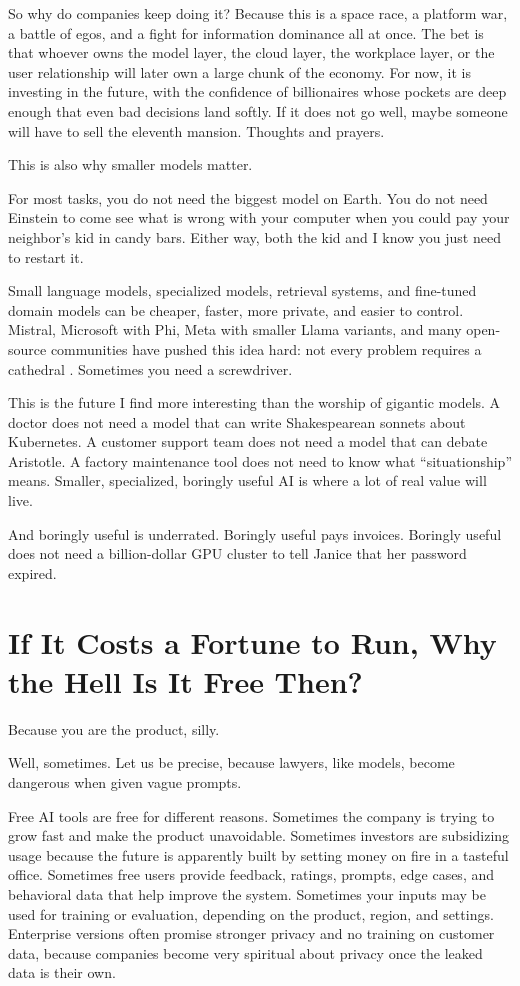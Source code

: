 \documentclass[12pt,oneside]{book}
\begin{document}
So why do companies keep doing it? Because this is a space race, a platform war, a battle of egos, and a fight for information dominance all at once. The bet is that whoever owns the model layer, the cloud layer, the workplace layer, or the user relationship will later own a large chunk of the economy. For now, it is investing in the future, with the confidence of billionaires whose pockets are deep enough that even bad decisions land softly. If it does not go well, maybe someone will have to sell the eleventh mansion. Thoughts and prayers.

This is also why smaller models matter.

For most tasks, you do not need the biggest model on Earth. You do not need Einstein to come see what is wrong with your computer when you could pay your neighbor's kid in candy bars. Either way, both the kid and I know you just need to restart it.

Small language models, specialized models, retrieval systems, and fine-tuned domain models can be cheaper, faster, more private, and easier to control. Mistral, Microsoft with Phi, Meta with smaller Llama variants, and many open-source communities have pushed this idea hard: not every problem requires a cathedral \parencite{jiang2023mistral,abdin2024phi,touvron2023llama}. Sometimes you need a screwdriver.

This is the future I find more interesting than the worship of gigantic models. A doctor does not need a model that can write Shakespearean sonnets about Kubernetes. A customer support team does not need a model that can debate Aristotle. A factory maintenance tool does not need to know what ``situationship'' means. Smaller, specialized, boringly useful AI is where a lot of real value will live.

And boringly useful is underrated. Boringly useful pays invoices. Boringly useful does not need a billion-dollar GPU cluster to tell Janice that her password expired.

\chapter{If It Costs a Fortune to Run, Why the Hell Is It Free Then?}

Because you are the product, silly.

Well, sometimes. Let us be precise, because lawyers, like models, become dangerous when given vague prompts.

Free AI tools are free for different reasons. Sometimes the company is trying to grow fast and make the product unavoidable. Sometimes investors are subsidizing usage because the future is apparently built by setting money on fire in a tasteful office. Sometimes free users provide feedback, ratings, prompts, edge cases, and behavioral data that help improve the system. Sometimes your inputs may be used for training or evaluation, depending on the product, region, and settings. Enterprise versions often promise stronger privacy and no training on customer data, because companies become very spiritual about privacy once the leaked data is their own.
\end{document}
